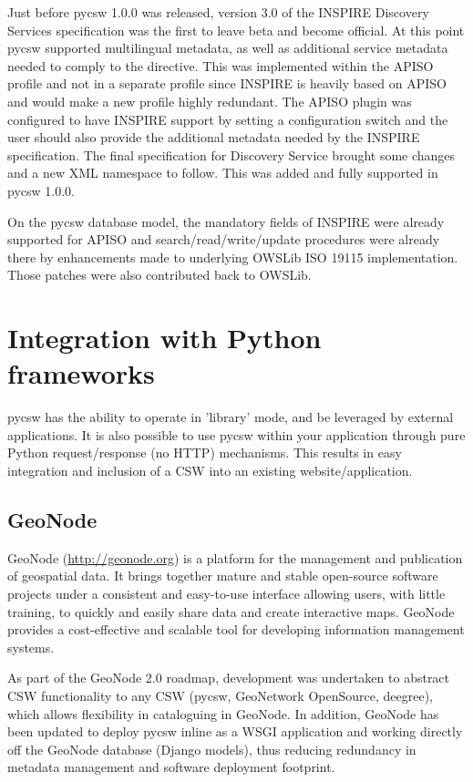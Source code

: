 Just before pycsw 1.0.0 was released, version 3.0 of the INSPIRE Discovery Services \citep{discovery:2011} specification was the first to leave beta and become official. At this point pycsw supported multilingual metadata, as well as additional service metadata needed to comply to the directive. This was implemented within the APISO profile and not in a separate profile since INSPIRE is heavily based on APISO and would make a new profile highly redundant. The APISO plugin was configured to have INSPIRE support by setting a configuration switch and the user should also provide the additional metadata needed by the INSPIRE specification. The final specification for Discovery Service brought some changes and a new XML namespace to follow. This was added and fully supported in pycsw 1.0.0.

On the pycsw database model, the mandatory fields of INSPIRE were already supported for APISO and search/read/write/update procedures were already there by enhancements made to underlying OWSLib ISO 19115 implementation. Those patches were also contributed back to OWSLib.


\section{Integration with Python frameworks}
\label{sec:integration}

pycsw has the ability to operate in 'library' mode, and be leveraged by external applications.  It is also possible to use pycsw within your application through pure Python request/response (no HTTP) mechanisms.  This results in easy integration and inclusion of a CSW into an existing website/application.

\subsection{GeoNode}
\label{subsec:geonode}

GeoNode (\url{http://geonode.org}) is a platform for the management and publication of  geospatial data.  It brings together mature and stable open-source  software projects under a consistent and easy-to-use interface allowing  users, with little training, to quickly and easily share data and create interactive maps. GeoNode provides a cost-effective and scalable tool for developing information management systems.

As part of the GeoNode 2.0 roadmap, development was undertaken to  abstract CSW functionality to any CSW (pycsw, GeoNetwork OpenSource, deegree), which allows flexibility in cataloguing in GeoNode.  In addition, GeoNode has been updated to deploy pycsw inline as a WSGI application and working directly off the GeoNode database (Django models), thus reducing redundancy in metadata management and software deployment footprint.

